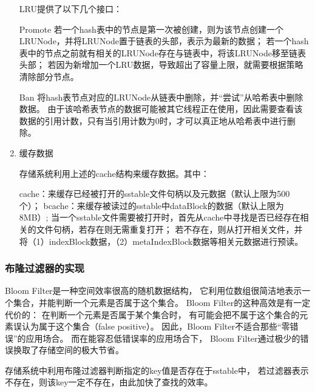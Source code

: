 \begin{enumerate}
LRU提供了以下几个接口：

Promote
若一个hash表中的节点是第一次被创建，则为该节点创建一个LRUNode，并将LRUNode置于链表的头部，表示为最新的数据；
若一个hash表中的节点之前就有相关的LRUNode存在与链表中，将该LRUNode移至链表头部；
若因为新增加一个LRU数据，导致超出了容量上限，就需要根据策略清除部分节点。

Ban
将hash表节点对应的LRUNode从链表中删除，并“尝试”从哈希表中删除数据。
由于该哈希表节点的数据可能被其它线程正在使用，因此需要查看该数据的引用计数，只有当引用计数为0时，才可以真正地从哈希表中进行删除。

		\item 缓存数据 
		
		存储系统利用上述的cache结构来缓存数据。其中：

cache：来缓存已经被打开的sstable文件句柄以及元数据（默认上限为500个）；
bcache：来缓存被读过的sstable中dataBlock的数据（默认上限为8MB）;
当一个sstable文件需要被打开时，首先从cache中寻找是否已经存在相关的文件句柄，若存在则无需重复打开；
若不存在，则从打开相关文件，并将（1）indexBlock数据，（2）metaIndexBlock数据等相关元数据进行预读。

		\end{enumerate}
		

		\subsubsection{布隆过滤器的实现}


		Bloom Filter是一种空间效率很高的随机数据结构，
		它利用位数组很简洁地表示一个集合，并能判断一个元素是否属于这个集合。
		Bloom Filter的这种高效是有一定代价的：
		在判断一个元素是否属于某个集合时，
		有可能会把不属于这个集合的元素误认为属于这个集合（false positive）。
		因此，Bloom Filter不适合那些“零错误”的应用场合。
		而在能容忍低错误率的应用场合下，
		Bloom Filter通过极少的错误换取了存储空间的极大节省。

存储系统中利用布隆过滤器判断指定的key值是否存在于sstable中，
若过滤器表示不存在，则该key一定不存在，由此加快了查找的效率。

